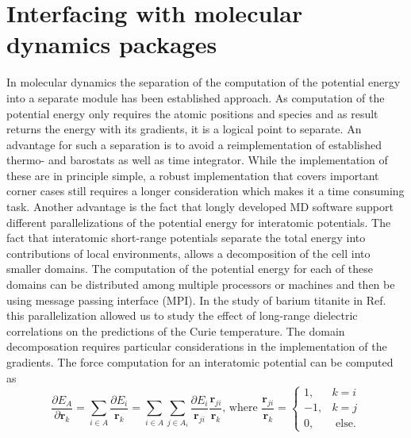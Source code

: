 \section{Interfacing with molecular dynamics packages}
In molecular dynamics the separation of the computation of the potential energy into a separate module has been established approach\cite{LAMMPS,abraham2015gromacs,kuhne2020cp2k,kapil2019pi}.
As computation of the potential energy only requires the atomic positions and species and as result returns the energy with its gradients, it is a logical point to separate.
An advantage for such a separation is to avoid a reimplementation of established thermo- and barostats as well as time integrator.
While the implementation of these are in principle simple, a robust implementation that covers important corner cases still requires a longer consideration which makes it a time consuming task.
Another advantage is the fact that longly developed MD software support different parallelizations of the potential energy for interatomic potentials.
The fact that interatomic short-range potentials separate the total energy into contributions of local environments, allows a decomposition of the cell into smaller domains.
The computation of the potential energy for each of these domains can be distributed among multiple processors or machines and then be using message passing interface (MPI).
In the study of barium titanite in Ref.~\cite{gigli2023modeling} this parallelization allowed us to study the effect of long-range dielectric correlations on the predictions of the Curie temperature.
The domain decomposation requires particular considerations in the implementation of the gradients.
The force computation for an interatomic potential can be computed as
\begin{equation}
  \label{eq:forces_interatomic_potential}
  \frac{\partial E_A}{\partial\mathbf{r}_k} = \sum_{i\in A} \frac{\partial E_i}{\mathbf{r}_k} = \sum_{i\in A}\sum_{j\in A_i} \frac{\partial E_i}{\mathbf{r}_{ji}} \frac{\mathbf{r}_{ji}}{\mathbf{r}_k}\textrm{, where }\frac{\mathbf{r}_{ji}}{\mathbf{r}_k} = \begin{cases}1,& k=i \\ -1,& k=j \\0,& \textrm{ else.} \end{cases}
\end{equation}
